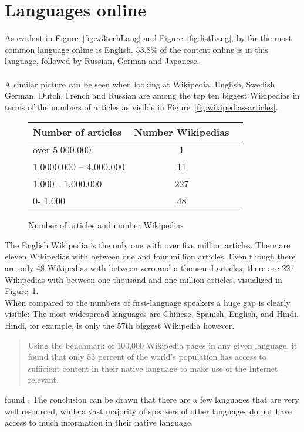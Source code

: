 \section{Languages online}

As evident in Figure~\ref{fig:w3techLang} and Figure~\ref{fig:listLang}, by far the most common language online is English. 53.8\% of the content online is in this language, followed by Russian, German and Japanese. \citep{w3techLang} \\
\\
A similar picture can be seen when looking at Wikipedia. English, Swedish, German, Dutch, French and Russian are among the top ten biggest Wikipedias in terms of the numbers of articles as visible in Figure~\ref{fig:wikipedias-articles}. \\
\begin{figure}[H]
\begin{center}
	\begin{tabular}{| l | c | r |}
		\hline			
		Number of articles & Number Wikipedias \\ \hline
		over 5.000.000 & 1 \\
		1.0000.000 -- 4.000.000 & 11 \\
		1.000 - 1.000.000 & 227 \\
		0- 1.000 & 48 \\
		\hline  
	\end{tabular}
	\end{center}
	\caption{Number of articles and number Wikipedias}
	\label{fig:tableNumWP}
\end{figure}

The English Wikipedia is the only one with over five million articles. There are eleven Wikipedias with between one and four million articles. Even though there are only 48 Wikipedias with between zero and a thousand articles, there are 227 Wikipedias with between one thousand and one million articles, visualized in Figure~\ref{fig:tableNumWP}. \citep{wiki:30} \\

When compared to the numbers of first-language speakers a huge gap is clearly visible: The most widespread languages are Chinese, Spanish, English, and Hindi. Hindi, for example, is only the 57th biggest Wikipedia however.
\begin{quote}
Using the benchmark of 100,000 Wikipedia pages in any given language, it found that only 53 percent of the world’s population has access to sufficient content in their native language to make use of the Internet relevant.
\end{quote} 
found \citet{atlanticLang}.
The conclusion can be drawn that there are a few languages that are very well resourced, while a vast majority of speakers of other languages do not have access to much information in their native language. 